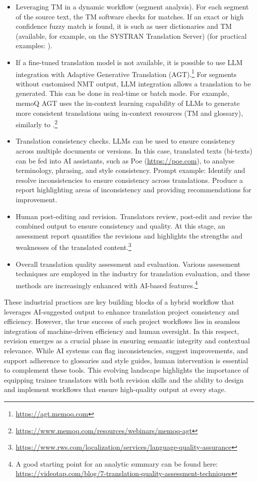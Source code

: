 \documentclass[output=paper]{langscibook}
\begin{document}
\begin{itemize}
\item Leveraging TM in a dynamic workflow (segment analysis). For each segment of the source text, the TM software checks for matches. If an exact or high confidence fuzzy match is found, it is   such as user dictionaries and TM (available, for example, on the SYSTRAN Translation Server) (for practical examples: \citealt{ziminagledhill23}).
\item If a fine-tuned translation model is not available, it is possible to use LLM integration with Adaptive Generative Translation (AGT).\footnote{\url{https://agt.memoq.com}} For segments without customised NMT output, LLM integration allows a translation to be generated. This can be done in real-time or batch mode. For example, memoQ AGT uses the in-context learning capability of LLMs to generate more consistent translations using in-context resources (TM and glossary), similarly to \citet{moslem-etal-2023-adaptive}.\footnote{\url{https://www.memoq.com/resources/webinars/memoq-agt}}
\item Translation consistency checks. LLMs can be used to ensure consistency across multiple documents or versions. In this case, translated texts (bi-texts) can be fed into AI assistants, such as Poe (\url{https://poe.com}), to analyse terminology, phrasing, and style consistency. Prompt example: Identify and resolve inconsistencies to ensure consistency across translations. Produce a report highlighting areas of inconsistency and providing recommendations for improvement.
\item Human post-editing and revision. Translators review, post-edit and revise the combined output to ensure consistency and quality. At this stage, an assessment report quantifies the revisions and highlights the strengths and weaknesses of the translated content.\footnote{\url{https://www.rws.com/localization/services/language-quality-assurance}}
\item Overall translation quality assessment and evaluation. Various assessment techniques are employed in the industry for translation evaluation, and these methods are increasingly enhanced with AI-based features.\footnote{A good starting point for an analytic summary can be found here: \url{https://videotap.com/blog/7-translation-quality-assessment-techniques}}
\end{itemize}
These industrial practices are key building blocks of a hybrid workflow that leverages AI-suggested output to enhance translation project consistency and efficiency. However, the true success of such project workflows lies in seamless integration of machine-driven efficiency and human oversight. In this respect, revision emerges as a crucial phase in ensuring semantic integrity and contextual relevance. While AI systems can flag inconsistencies, suggest improvements, and support adherence to glossaries and style guides, human intervention is essential to complement these tools. This evolving landscape highlights the importance of equipping trainee translators with both revision skills and the ability to design and implement workflows that ensure high-quality output at every stage.
\end{document}
